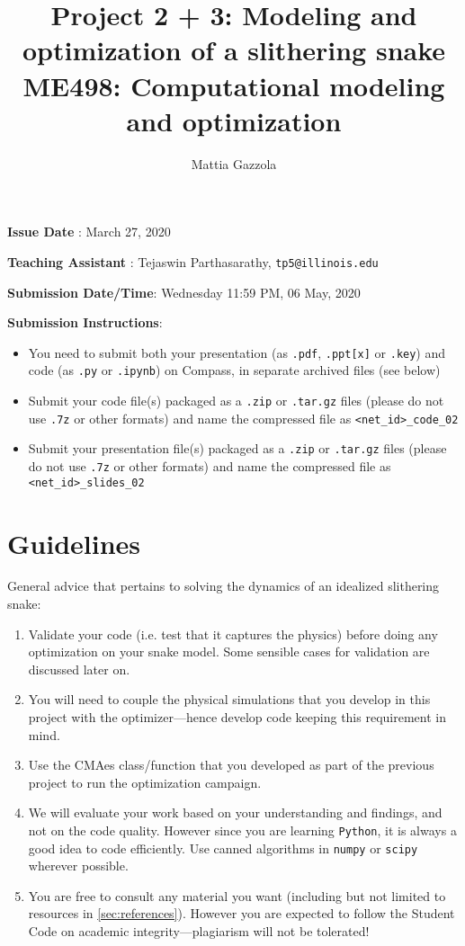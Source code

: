\documentclass[11pt]{article}
\author{Mattia Gazzola}
\date{}
\title{Project 2 + 3: Modeling and optimization of a slithering snake\\\medskip
\large ME498: Computational modeling and optimization}
\begin{document}
\maketitle
\textbf{Issue Date} : March 27, 2020

\textbf{Teaching Assistant} : Tejaswin Parthasarathy, \texttt{tp5@illinois.edu}

\textbf{Submission Date/Time}: Wednesday 11:59 PM, 06 May, 2020

\textbf{Submission Instructions}:
\begin{itemize}
\item You need to submit both your presentation (as \texttt{.pdf}, \texttt{.ppt[x]} or \texttt{.key}) and code
(as \texttt{.py} or \texttt{.ipynb}) on Compass, in separate archived files (see below)
\item Submit your code file(s) packaged as a \texttt{.zip} or \texttt{.tar.gz} files (please do not use
\texttt{.7z} or other formats) and name the compressed file as \texttt{<net\_id>\_code\_02}
\item Submit your presentation file(s) packaged as a \texttt{.zip} or \texttt{.tar.gz} files (please do not use
\texttt{.7z} or other formats) and name the compressed file as \texttt{<net\_id>\_slides\_02}
\end{itemize}

\newpage

\section{Guidelines}
\label{sec:orge3a2e00}
General advice that pertains to solving the dynamics of an idealized
slithering snake:
\begin{enumerate}
\item Validate your code (i.e. test that it captures the physics) before doing
any optimization on your snake model. Some sensible cases for validation are
discussed later on.
\item You will need to couple the physical simulations that you develop in this
project with the optimizer---hence develop code keeping this requirement in mind.
\item Use the CMAes class/function that you developed as part of the previous
project to run the optimization campaign.
\item We will evaluate your work based on your understanding and findings, and
not on the code quality. However since you are learning \texttt{Python}, it is
always a good idea to code efficiently. Use canned algorithms in \texttt{numpy} or
\texttt{scipy} wherever possible.
\item You are free to consult any material you want (including but not limited to
resources in \cref{sec:references}). However you are expected to follow the
Student Code on academic integrity---plagiarism will not be tolerated!
\end{enumerate}
\end{document}
